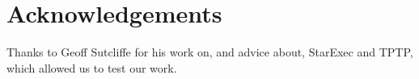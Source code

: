 \documentclass{llncs}
\begin{document}
\section{Acknowledgements}

Thanks to Geoff Sutcliffe for his work on, and advice about, StarExec
and TPTP, which allowed us to test our work.



\end{document}
